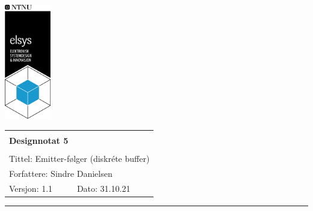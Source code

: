 \documentclass[a4paper,11pt,norsk]{article}
\begin{document}
\begin{minipage}[c]{0.15\textwidth}
\includegraphics[width=2.0cm]{elsys_pos_staaende_ntnu.png}
\end{minipage}
\begin{minipage}[c]{0.85\textwidth}

\renewcommand{\arraystretch}{1.7}
\large 
\begin{tabularx}{\textwidth}{|X|X|}
\hline
\multicolumn{2}{|l|}{} \\
\multicolumn{2}{|l|}{\huge \textbf{Designnotat 5}} \\
\multicolumn{2}{|l|}{}  \\
\hline
\multicolumn{2}{|l|}{Tittel: 
Emitter-følger (diskréte buffer)
} \\
\hline
\multicolumn{2}{|l|}{Forfattere: 
Sindre Danielsen
} \\
\hline
Versjon: 1.1 & Dato: 31.10.21
\\
\hline 
\end{tabularx}
\end{minipage}
\normalsize


\setlength{\parskip}{0ex}
\renewcommand{\baselinestretch}{0.1}\normalsize
\tableofcontents
\renewcommand{\baselinestretch}{1.00}\normalsize
\setlength{\parskip}{2ex}
\rule{\textwidth}{1pt}

\newpage
\end{document}
